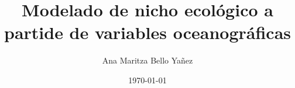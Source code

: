 \documentclass[12pt,letterpaper]{book}%
\begin{document}
\author{Ana Maritza Bello Yañez} 
\title{Modelado de nicho ecológico a partide de variables oceanográficas} 
\date{\today} 






%


\mainmatter
\setcounter{chapter}{0}
\setcounter{page}{0}
\setcounter{secnumdepth}{4}




% 




%
%
%
%
%
%
\backmatter 
\pagebreak
 

\end{document}
